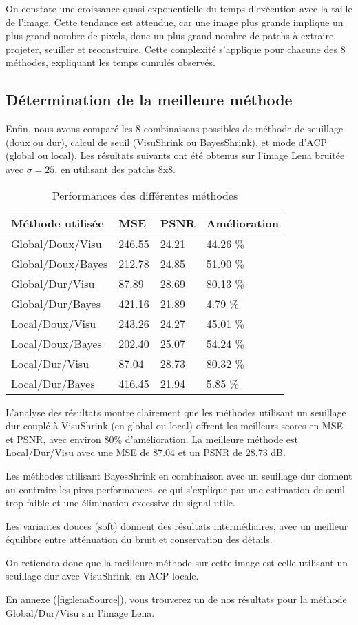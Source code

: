 On constate une croissance quasi-exponentielle du temps d'exécution avec la taille de l’image. Cette tendance est attendue, car une image plus grande implique un plus grand nombre de pixels, donc un plus grand nombre de patchs à extraire, projeter, seuiller et reconstruire. Cette complexité s'applique pour chacune des 8 méthodes, expliquant les temps cumulés observés.


\subsection{Détermination de la meilleure méthode}

Enfin, nous avons comparé les 8 combinaisons possibles de méthode de seuillage (doux ou dur), calcul de seuil (VisuShrink ou BayesShrink), et mode d’ACP (global ou local). Les résultats suivants ont été obtenus sur l’image Lena bruitée avec $\sigma = 25$, en utilisant des patchs 8x8.

\begin{table}[hbt!]
    \centering
    \begin{tabular}{|l|l|l|l|}
    \hline
        Méthode utilisée & MSE & PSNR & Amélioration \\ \hline
        Global/Doux/Visu & 246.55 & 24.21 & 44.26 \%\\ \hline
        Global/Doux/Bayes & 212.78 & 24.85 & 51.90 \%  \\ \hline
        Global/Dur/Visu & 87.89 & 28.69 & 80.13 \% \\ \hline
        Global/Dur/Bayes & 421.16 & 21.89 & 4.79 \% \\ \hline
        Local/Doux/Visu & 243.26 & 24.27 & 45.01 \% \\ \hline
        Local/Doux/Bayes & 202.40 & 25.07 & 54.24 \%\\ \hline
        Local/Dur/Visu & 87.04 & 28.73 & 80.32 \% \\ \hline
        Local/Dur/Bayes & 416.45 & 21.94 & 5.85 \% \\ \hline
    \end{tabular}
    \caption{Performances des différentes méthodes}
\end{table}

L'analyse des résultats montre clairement que les méthodes utilisant un seuillage dur couplé à VisuShrink (en global ou local) offrent les meilleurs scores en MSE et PSNR, avec environ 80\% d'amélioration. La meilleure méthode est Local/Dur/Visu avec une MSE de 87.04 et un PSNR de 28.73 dB.

Les méthodes utilisant BayesShrink en combinaison avec un seuillage dur donnent au contraire les pires performances, ce qui s'explique par une estimation de seuil trop faible et une élimination excessive du signal utile.

Les variantes douces (soft) donnent des résultats intermédiaires, avec un meilleur équilibre entre atténuation du bruit et conservation des détails.

On retiendra donc que la meilleure méthode sur cette image est celle utilisant un seuillage dur avec VisuShrink, en ACP locale.\par
En annexe (\ref{fig:lenaSource}), vous trouverez un de nos résultats pour la méthode Global/Dur/Visu sur l'image Lena.
